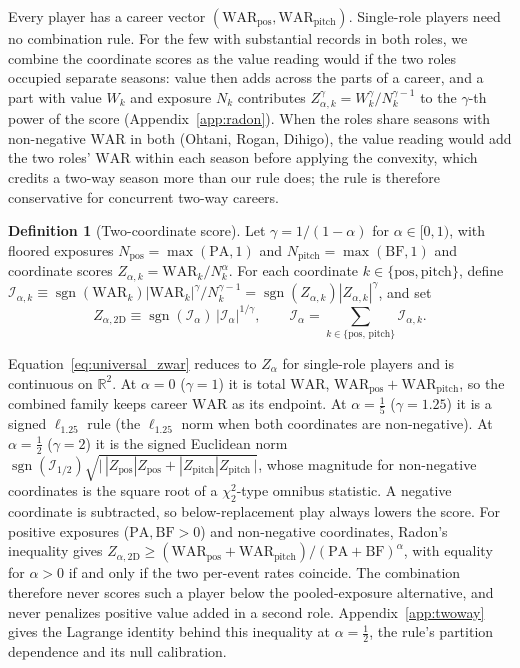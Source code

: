 \documentclass[11pt,letterpaper]{article}
\theoremstyle{plain}
\theoremstyle{definition}
\newtheorem{definition}{Definition}
\theoremstyle{remark}
\newcommand{\WAR}{\mathrm{WAR}}
\newcommand{\PA}{\mathrm{PA}}
\newcommand{\BF}{\mathrm{BF}}
\newcommand{\Zpos}{Z_{\mathrm{pos}}}
\newcommand{\Zpitch}{Z_{\mathrm{pitch}}}
\newcommand{\R}{\mathbb{R}}
\newcommand{\sgn}{\operatorname{sgn}}
\newcommand{\Ical}{\mathcal{I}}
\begin{document}
Every player has a career vector $(\WAR_{\mathrm{pos}}, \WAR_{\mathrm{pitch}})$. Single-role players need no combination rule. For the few with substantial records in both roles, we combine the coordinate scores as the value reading would if the two roles occupied separate seasons: value then adds across the parts of a career, and a part with value $W_k$ and exposure $N_k$ contributes $Z_{\alpha,k}^{\gamma} = W_k^{\gamma}/N_k^{\gamma-1}$ to the $\gamma$-th power of the score (Appendix~\ref{app:radon}). When the roles share seasons with non-negative $\WAR$ in both (Ohtani, Rogan, Dihigo), the value reading would add the two roles' $\WAR$ within each season before applying the convexity, which credits a two-way season more than our rule does; the rule is therefore conservative for concurrent two-way careers.

\begin{definition}[Two-coordinate score]
\label{def:twoway}
Let $\gamma = 1/(1-\alpha)$ for $\alpha \in [0,1)$, with floored exposures $N_{\mathrm{pos}} = \max(\PA, 1)$ and $N_{\mathrm{pitch}} = \max(\BF, 1)$ and coordinate scores $Z_{\alpha,k} = \WAR_k/N_k^\alpha$. For each coordinate $k \in \{\mathrm{pos}, \mathrm{pitch}\}$, define $\Ical_{\alpha,k} \equiv \sgn(\WAR_k)|\WAR_k|^{\gamma}/N_k^{\gamma-1} = \sgn(Z_{\alpha,k})|Z_{\alpha,k}|^{\gamma}$, and set
\begin{equation}
    Z_{\alpha,\mathrm{2D}} \equiv \sgn(\Ical_\alpha)\,|\Ical_\alpha|^{1/\gamma},
    \qquad
    \Ical_{\alpha} = \sum_{k \in \{\mathrm{pos},\,\mathrm{pitch}\}} \Ical_{\alpha,k}.
    \label{eq:universal_zwar}
\end{equation}
\end{definition}

Equation~\eqref{eq:universal_zwar} reduces to $Z_\alpha$ for single-role players and is continuous on $\R^2$. At $\alpha = 0$ ($\gamma = 1$) it is total $\WAR$, $\WAR_{\mathrm{pos}} + \WAR_{\mathrm{pitch}}$, so the combined family keeps career $\WAR$ as its endpoint. At $\alpha = \tfrac15$ ($\gamma = 1.25$) it is a signed $\ell_{1.25}$ rule (the $\ell_{1.25}$ norm when both coordinates are non-negative). At $\alpha = \tfrac12$ ($\gamma = 2$) it is the signed Euclidean norm $\sgn(\Ical_{1/2})\sqrt{\bigl|\,|\Zpos|\Zpos + |\Zpitch|\Zpitch\,\bigr|}$, whose magnitude for non-negative coordinates is the square root of a $\chi^2_2$-type omnibus statistic. A negative coordinate is subtracted, so below-replacement play always lowers the score. For positive exposures ($\PA, \BF > 0$) and non-negative coordinates, Radon's inequality gives $Z_{\alpha,\mathrm{2D}} \ge (\WAR_{\mathrm{pos}} + \WAR_{\mathrm{pitch}})/(\PA + \BF)^{\alpha}$, with equality for $\alpha > 0$ if and only if the two per-event rates coincide. The combination therefore never scores such a player below the pooled-exposure alternative, and never penalizes positive value added in a second role. Appendix~\ref{app:twoway} gives the Lagrange identity behind this inequality at $\alpha = \tfrac12$, the rule's partition dependence and its null calibration.
\end{document}
